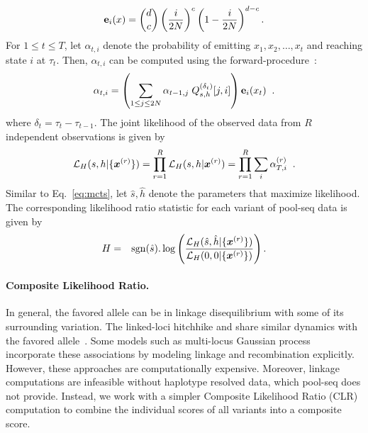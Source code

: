 \begin{equation*}
{\bf e}_{i}(x) = {d \choose c} \left(\frac{i}{2N} \right)^c\left (1- 
\frac{i}{2N} \right)^{d-c}.
\end{equation*}
For $1\le t\le T$, let $\alpha_{t,i}$ denote the probability of
emitting $x_1,x_2,\ldots,x_t$ and reaching state $i$ at
$\tau_t$. Then, $\alpha_{t,i}$ can be computed using the
forward-procedure~\cite{durbin1998biological}:
\begin{equation}
  \alpha_{t,i} = \left( \sum_{1\le j\le 2N} 
  \alpha_{t-1,j}\;Q^{(\delta_t)}_{s,h}[j,i] \right) {\bf e}_{i}(x_t)\;\; .
  \label{eq:hmm}
\end{equation}
where $\delta_t=\tau_t-\tau_{t-1}$. The joint likelihood of the
observed data from $R$ independent observations is given by
\begin{equation}
  {\cal L}_{H}(s,h|\{\bm{x}^{(r)}\})=\prod_{r=1}^R{\cal L}_{H}(s,h|\bm{x}^{(r)}) = 
  \prod_{r=1}^R \sum_i\alpha_{T,i}^{(r)}\;\;.
  \label{eq:hmmlik}
\end{equation}
Similar to Eq.~\ref{eq:mcts}, let $\hat{s},\hat{h}$ denote the
parameters that maximize likelihood. The corresponding likelihood
ratio statistic for each variant of pool-seq data is given by
\begin{eqnarray}
H &=& \operatorname{sgn} (\hat{s}). \log 
\left(\frac{{\cal L}_H(\hat{s},\hat{h}|\{\bm{x}^{(r)}\})}{{\cal L}_H(0,0|\{\bm{x}^{(r)}\})}\right).
\label{eq:hmmml}
\end{eqnarray}

\paragraph{Composite Likelihood Ratio.}
In general, the favored allele can be in linkage disequilibrium with
some of its surrounding variation. The linked-loci hitchhike and share
similar dynamics with the favored allele~\cite{elyashiv2016genomic}.  Some 
models such as
multi-locus Gaussian process~\cite{Terhorst2015Multi} incorporate
these associations by modeling linkage and recombination
explicitly. However, these approaches are computationally
expensive. Moreover, linkage computations are infeasible without
haplotype resolved data, which pool-seq does not provide. Instead, we
work with a simpler Composite Likelihood Ratio
(CLR)~\cite{nielsen2005genomic,williamson2007localizing} computation
to combine the individual scores of all variants into a composite
score.


